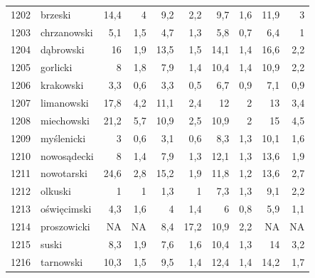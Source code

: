 \begin{center}
\begin{longtable}{lp{3cm}rrrrrrrr}
1202 & brzeski                 & 14,4    & 4           & 9,2      & 2,2          & 9,7      & 1,6          & 11,9     & 3            \\
1203 & chrzanowski             & 5,1     & 1,5         & 4,7      & 1,3          & 5,8      & 0,7          & 6,4      & 1            \\
1204 & dąbrowski               & 16      & 1,9         & 13,5     & 1,5          & 14,1     & 1,4          & 16,6     & 2,2          \\
1205 & gorlicki                & 8       & 1,8         & 7,9      & 1,4          & 10,4     & 1,4          & 10,9     & 2,2          \\
1206 & krakowski               & 3,3     & 0,6         & 3,3      & 0,5          & 6,7      & 0,9          & 7,1      & 0,9          \\
1207 & limanowski              & 17,8    & 4,2         & 11,1     & 2,4          & 12       & 2            & 13       & 3,4          \\
1208 & miechowski              & 21,2    & 5,7         & 10,9     & 2,5          & 10,9     & 2            & 15       & 4,5          \\
1209 & myślenicki              & 3       & 0,6         & 3,1      & 0,6          & 8,3      & 1,3          & 10,1     & 1,6          \\
1210 & nowosądecki             & 8       & 1,4         & 7,9      & 1,3          & 12,1     & 1,3          & 13,6     & 1,9          \\
1211 & nowotarski              & 24,6    & 2,8         & 15,2     & 1,9          & 11,8     & 1,2          & 13,6     & 2,7          \\
1212 & olkuski                 & 1       & 1           & 1,3      & 1            & 7,3      & 1,3          & 9,1      & 2,2          \\
1213 & oświęcimski             & 4,3     & 1,6         & 4        & 1,4          & 6        & 0,8          & 5,9      & 1,1          \\
1214 & proszowicki             & NA      & NA          & 8,4      & 17,2         & 10,9     & 2,2          & NA       & NA           \\
1215 & suski                   & 8,3     & 1,9         & 7,6      & 1,6          & 10,4     & 1,3          & 14       & 3,2          \\
1216 & tarnowski               & 10,3    & 1,5         & 9,5      & 1,4          & 12,4     & 1,4          & 14,2     & 1,7          \\

\end{longtable}
\end{center}
